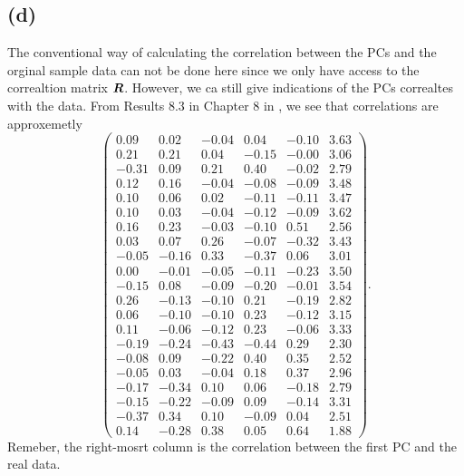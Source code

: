 \subsection*{(d)}
\label{sec:d-3}

The conventional way of calculating the correlation between the PCs and
the orginal sample data can not be done here since we only have access
to the correaltion matrix $\bm{R}$. However, we ca still give indications
of the PCs correaltes with the data. From Results 8.3 in Chapter 8 in
\cite[p.433]{book}, we see that correlations are approxemetly
\begin{equation*}
  \begin{pmatrix}
    0.09 &0.02 &-0.04 &0.04 &-0.10 &3.63 \\ 
0.21 &0.21 &0.04 &-0.15 &-0.00 &3.06 \\ 
-0.31 &0.09 &0.21 &0.40 &-0.02 &2.79 \\ 
0.12 &0.16 &-0.04 &-0.08 &-0.09 &3.48 \\ 
0.10 &0.06 &0.02 &-0.11 &-0.11 &3.47 \\ 
0.10 &0.03 &-0.04 &-0.12 &-0.09 &3.62 \\ 
0.16 &0.23 &-0.03 &-0.10 &0.51 &2.56 \\ 
0.03 &0.07 &0.26 &-0.07 &-0.32 &3.43 \\ 
-0.05 &-0.16 &0.33 &-0.37 &0.06 &3.01 \\ 
0.00 &-0.01 &-0.05 &-0.11 &-0.23 &3.50 \\ 
-0.15 &0.08 &-0.09 &-0.20 &-0.01 &3.54 \\ 
0.26 &-0.13 &-0.10 &0.21 &-0.19 &2.82 \\ 
0.06 &-0.10 &-0.10 &0.23 &-0.12 &3.15 \\ 
0.11 &-0.06 &-0.12 &0.23 &-0.06 &3.33 \\ 
-0.19 &-0.24 &-0.43 &-0.44 &0.29 &2.30 \\ 
-0.08 &0.09 &-0.22 &0.40 &0.35 &2.52 \\ 
-0.05 &0.03 &-0.04 &0.18 &0.37 &2.96 \\ 
-0.17 &-0.34 &0.10 &0.06 &-0.18 &2.79 \\ 
-0.15 &-0.22 &-0.09 &0.09 &-0.14 &3.31 \\ 
-0.37 &0.34 &0.10 &-0.09 &0.04 &2.51 \\ 
0.14 &-0.28 &0.38 &0.05 &0.64 &1.88  
  \end{pmatrix}.
\end{equation*}
Remeber, the right-mosrt column is the correlation between the first PC
and the real data.

